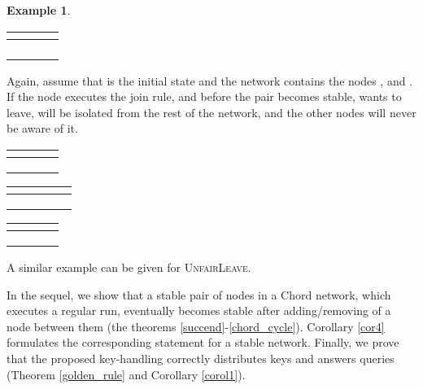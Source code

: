 \documentclass{amsart}
\theoremstyle{definition}
\newtheorem{example}{Example}[section]
\begin{document}
\begin{example}
\begin{center}
\begin{tabular}{|c|c|c|c|}
\hline
\multicolumn{4}{|c|}{\boldmath{}} \\
\hline
 &  &  & \\
\hline
 &  & \boldmath{} &  \\
\hline
 &  &  &  \\
\hline
 &  &  &  \\
\hline
\end{tabular}
\end{center}

Again, assume that  is the initial state and the network contains the nodes ,  and .
If the node  executes the join rule, and before the pair
 becomes stable,  wants to leave,
 will be isolated from the rest of the network, and the other
nodes will  never be aware of it.

\begin{center}
\begin{tabular}{|c|c|c|c|}
\hline
\multicolumn{4}{|c|}{\boldmath{}} \\
\hline
 &  &  & \\
\hline
 &  &  &  \\
\hline
 &  &  &  \\
\hline
\end{tabular}

\begin{tabular}{|c|c|c|c|c|}
\hline
\multicolumn{5}{|c|}{\boldmath{}} \\
\hline
 &  & \boldmath{} &  & \\
\hline
 &  & \boldmath{} &  &  \\
\hline
 &  & \boldmath{} &   &  \\
\hline
\end{tabular}
\vspace{1mm}

\begin{tabular}{|c|c|c|c|}
\hline
\multicolumn{4}{|c|}{\boldmath{}} \\
\hline
 &  &  & \\
\hline
 &  &  &  \\
\hline
 &  &  &  \\
\hline
\end{tabular}
\end{center}

A similar example can be given for \textsc{UnfairLeave}. \hfill 

\end{example}

In the sequel, we show that a stable pair of nodes in a Chord
network, which executes a regular run, eventually becomes stable
after adding/removing of a node between them (the theorems
\ref{succend}-\ref{chord_cycle}). Corollary \ref{cor4} formulates
the corresponding statement for a stable network. Finally, we
prove that the proposed key-handling correctly distributes keys
and answers queries (Theorem \ref{golden_rule} and Corollary
\ref{corol1}).
\end{document}
